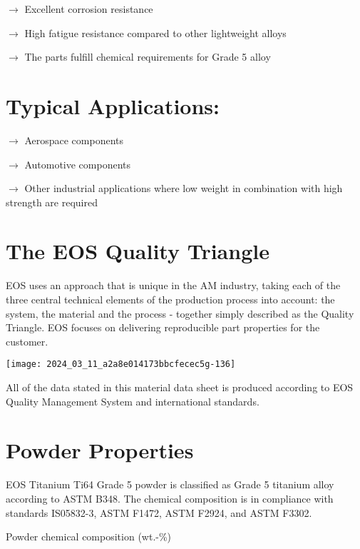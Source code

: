 \documentclass[10pt]{article}
\begin{document}
$\longrightarrow$ Excellent corrosion resistance

$\longrightarrow$ High fatigue resistance compared to other lightweight alloys

$\longrightarrow$ The parts fulfill chemical requirements for Grade 5 alloy

\section*{Typical Applications:}
$\longrightarrow$ Aerospace components

$\longrightarrow$ Automotive components

$\longrightarrow$ Other industrial applications where low weight in combination with high strength are required

\section*{The EOS Quality Triangle}
EOS uses an approach that is unique in the AM industry, taking each of the three central technical elements of the production process into account: the system, the material and the process - together simply described as the Quality Triangle. EOS focuses on delivering reproducible part properties for the customer.

\begin{center}
\texttt{[image: 2024\_03\_11\_a2a8e014173bbcfecec5g-136]}
\end{center}

All of the data stated in this material data sheet is produced according to EOS Quality Management System and international standards.

\section*{Powder Properties}
EOS Titanium Ti64 Grade 5 powder is classified as Grade 5 titanium alloy according to ASTM B348. The chemical composition is in compliance with standards IS05832-3, ASTM F1472, ASTM F2924, and ASTM F3302.

Powder chemical composition (wt.-\%)
\end{document}
